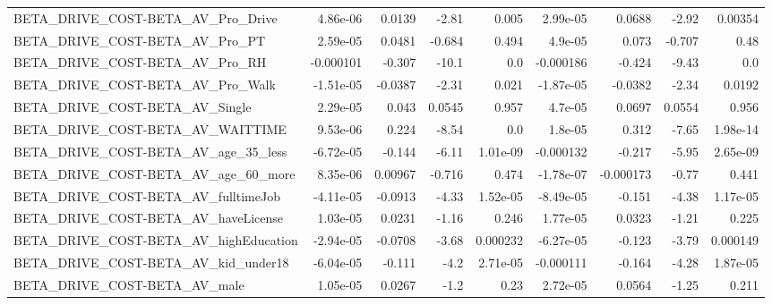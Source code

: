 \begin{tabular}{lrrrrrrrr}
BETA\_DRIVE\_COST-BETA\_AV\_Pro\_Drive                  &    4.86e-06 &       0.0139 &     -2.81 &    0.005 &   2.99e-05 &      0.0688 &        -2.92 &       0.00354 \\
BETA\_DRIVE\_COST-BETA\_AV\_Pro\_PT                     &    2.59e-05 &       0.0481 &    -0.684 &    0.494 &    4.9e-05 &       0.073 &       -0.707 &          0.48 \\
BETA\_DRIVE\_COST-BETA\_AV\_Pro\_RH                     &   -0.000101 &       -0.307 &     -10.1 &      0.0 &  -0.000186 &      -0.424 &        -9.43 &           0.0 \\
BETA\_DRIVE\_COST-BETA\_AV\_Pro\_Walk                   &   -1.51e-05 &      -0.0387 &     -2.31 &    0.021 &  -1.87e-05 &     -0.0382 &        -2.34 &        0.0192 \\
BETA\_DRIVE\_COST-BETA\_AV\_Single                     &    2.29e-05 &        0.043 &    0.0545 &    0.957 &    4.7e-05 &      0.0697 &       0.0554 &         0.956 \\
BETA\_DRIVE\_COST-BETA\_AV\_WAITTIME                   &    9.53e-06 &        0.224 &     -8.54 &      0.0 &    1.8e-05 &       0.312 &        -7.65 &      1.98e-14 \\
BETA\_DRIVE\_COST-BETA\_AV\_age\_35\_less                &   -6.72e-05 &       -0.144 &     -6.11 & 1.01e-09 &  -0.000132 &      -0.217 &        -5.95 &      2.65e-09 \\
BETA\_DRIVE\_COST-BETA\_AV\_age\_60\_more                &    8.35e-06 &      0.00967 &    -0.716 &    0.474 &  -1.78e-07 &   -0.000173 &        -0.77 &         0.441 \\
BETA\_DRIVE\_COST-BETA\_AV\_fulltimeJob                &   -4.11e-05 &      -0.0913 &     -4.33 & 1.52e-05 &  -8.49e-05 &      -0.151 &        -4.38 &      1.17e-05 \\
BETA\_DRIVE\_COST-BETA\_AV\_haveLicense                &    1.03e-05 &       0.0231 &     -1.16 &    0.246 &   1.77e-05 &      0.0323 &        -1.21 &         0.225 \\
BETA\_DRIVE\_COST-BETA\_AV\_highEducation              &   -2.94e-05 &      -0.0708 &     -3.68 & 0.000232 &  -6.27e-05 &      -0.123 &        -3.79 &      0.000149 \\
BETA\_DRIVE\_COST-BETA\_AV\_kid\_under18                &   -6.04e-05 &       -0.111 &      -4.2 & 2.71e-05 &  -0.000111 &      -0.164 &        -4.28 &      1.87e-05 \\
BETA\_DRIVE\_COST-BETA\_AV\_male                       &    1.05e-05 &       0.0267 &      -1.2 &     0.23 &   2.72e-05 &      0.0564 &        -1.25 &         0.211 \\

\end{tabular}
